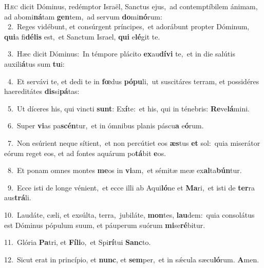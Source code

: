 \lettrine{\initial\textcolor{\initialcolor}{H}}{æc} dicit Dóminus, redémptor Israël, Sanctus ejus,~\dagger ad contemptíbilem ánimam, ad abomi\-\textbf{ná}\-tam \textbf{gen}\-tem,~\star ad servum \textbf{do}\-mi\-\textbf{nó}\-rum:\\
{\numbfont\textcolor{\numbcolor}{~2.}}~Reges vidébunt, et consúrgent príncipes,~\dagger et adorábunt propter Dóminum, \textbf{qui}\-a fi\-\textbf{dé}\-\textbf{lis} est,~\star et Sanctum Israel, \textbf{qui} e\-\textbf{lé}\-git te.\par
{\numbfont\textcolor{\numbcolor}{~3.}}~Hæc dicit Dóminus:~\dagger In témpore plácito \textbf{ex}\-au\-\textbf{dí}\-\textbf{vi} te,~\star et in die salútis auxili\-\textbf{á}\-tus sum \textbf{tu}\-i:\par
{\numbfont\textcolor{\numbcolor}{~4.}}~Et servávi te, et dedi te in \textbf{fœ}\-dus \textbf{pó}\-\textbf{pu}li,~\star ut suscitáres terram, et possidéres haereditátes \textbf{dis}\-si\-\textbf{pá}\-tas:\par
{\numbfont\textcolor{\numbcolor}{~5.}}~Ut díceres his, qui vincti \textbf{sunt}\-: Ex\-\textbf{í}\-te:~\star et his, qui in ténebris: \textbf{Re}\-ve\-\textbf{lá}\-mini.\par
{\numbfont\textcolor{\numbcolor}{~6.}}~Super \textbf{vi}\-as pa\-\textbf{scén}\-tur,~\star et in ómnibus planis páscu\textbf{a} e\-\textbf{ó}\-rum.\par
{\numbfont\textcolor{\numbcolor}{~7.}}~Non esúrient neque sítient,~\dagger et non percútiet eos \textbf{æs}\-tus \textbf{et} sol:~\star quia miserátor eórum reget eos, et ad fontes aquárum po\-\textbf{tá}\-bit \textbf{e}\-os.\par
{\numbfont\textcolor{\numbcolor}{~8.}}~Et ponam omnes montes \textbf{me}\-os in \textbf{vi}\-am,~\star et sémitæ meæ ex\-\textbf{al}\-ta\-\textbf{bún}\-tur.\par
{\numbfont\textcolor{\numbcolor}{~9.}}~Ecce isti de longe vénient,~\dagger et ecce illi ab Aqui\-\textbf{ló}\-ne et \textbf{Ma}\-ri,~\star et isti de \textbf{ter}\-ra aus\-\textbf{trá}\-li.\par
{\numbfont\textcolor{\numbcolor}{10.}}~Laudáte, cæli, et exsúlta, terra,~\dagger jubiláte, \textbf{mon}\-tes, \textbf{lau}\-dem:~\star quia consolátus est Dóminus pópulum suum, et páuperum suórum \textbf{mi}\-se\-\textbf{ré}\-bitur.\par
{\numbfont\textcolor{\numbcolor}{11.}}~Glória \textbf{Pa}\-tri, et \textbf{Fí}\-\textbf{li}o,~\star et Spi\-\textbf{rí}\-tui \textbf{Sanc}\-to.\par
{\numbfont\textcolor{\numbcolor}{12.}}~Sicut erat in princípio, et \textbf{nunc}\-, et \textbf{sem}\-per,~\star et in sǽcula sæcu\-\textbf{ló}\-rum. \textbf{A}\-men.\par
